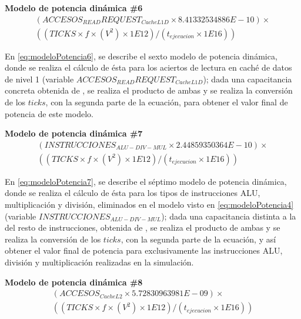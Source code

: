 \par{\textbf{Modelo de potencia dinámica \#6}}{
\begin{equation}
\begin{split}
(ACCESOS_{READ}REQUEST_{CacheL1D} \times 8.41332534886E-10) \times \\ ((TICKS \times f \times (V^2) \times 1E12) / (t_{ejecucion} \times 1E16))
\end{split}
\label{eq:modeloPotencia6}
\end{equation}
}

En \ref{eq:modeloPotencia6}, se describe el sexto modelo de potencia dinámica, donde se realiza el cálculo de ésta para los aciertos de lectura en caché de datos de nivel 1 (variable $ACCESOS_{READ}REQUEST_{CacheL1D}$); dada una capacitancia concreta obtenida de \cite{soton393728} \cite{soton418538}, se realiza el producto de ambas y se realiza la conversión de los $ticks$, con la segunda parte de la ecuación, para obtener el valor final de potencia de este modelo.

\par{\textbf{Modelo de potencia dinámica \#7}}{
\begin{equation}
\begin{split}
(INSTRUCCIONES_{ALU-DIV-MUL} \times 2.44859350364E-10) \times \\ ((TICKS \times f \times (V^2) \times 1E12) / (t_{ejecucion} \times 1E16))
\end{split}
\label{eq:modeloPotencia7}
\end{equation}
}

En \ref{eq:modeloPotencia7}, se describe el séptimo modelo de potencia dinámica, donde se realiza el cálculo de ésta para los tipos de instrucciones \ac{ALU}, multiplicación y división, eliminados en el modelo visto en \ref{eq:modeloPotencia4} (variable $INSTRUCCIONES_{ALU-DIV-MUL}$); dada una capacitancia distinta a la del resto de instrucciones, obtenida de \cite{soton393728} \cite{soton418538}, se realiza el producto de ambas y se realiza la conversión de los $ticks$, con la segunda parte de la ecuación, y así obtener el valor final de potencia para exclusivamente las instrucciones ALU, división y multiplicación realizadas en la simulación.

\par{\textbf{Modelo de potencia dinámica \#8}}{
\begin{equation}
\begin{split}
(ACCESOS_{CacheL2} \times 5.72830963981E-09) \times \\ ((TICKS \times f \times (V^2) \times 1E12) / (t_{ejecucion} \times 1E16))
\label{eq:modeloPotencia8}
\end{split}
\end{equation}
}

